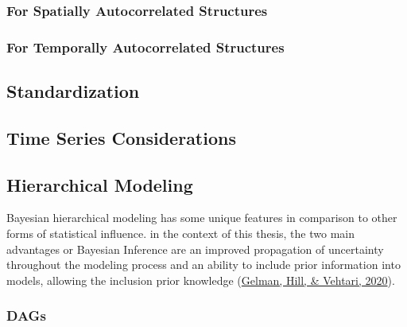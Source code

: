 \documentclass[12pt,twoside]{reedthesis}
\begin{document}
\hypertarget{for-spatially-autocorrelated-structures}{%
\subsubsection{For Spatially Autocorrelated Structures}\label{for-spatially-autocorrelated-structures}}

\hypertarget{for-temporally-autocorrelated-structures}{%
\subsubsection{For Temporally Autocorrelated Structures}\label{for-temporally-autocorrelated-structures}}

\hypertarget{standardization}{%
\subsection{Standardization}\label{standardization}}

\hypertarget{time-series-considerations}{%
\subsection{Time Series Considerations}\label{time-series-considerations}}

\hypertarget{hierarchical-modeling}{%
\subsection{Hierarchical Modeling}\label{hierarchical-modeling}}

Bayesian hierarchical modeling has some unique features in comparison to other forms of statistical influence. in the context of this thesis, the two main advantages or Bayesian Inference are an improved propagation of uncertainty throughout the modeling process and an ability to include prior information into models, allowing the inclusion prior knowledge (\protect\hyperlink{ref-gelmanRegressionOtherStories2020}{Gelman, Hill, \& Vehtari, 2020}).

\hypertarget{dags}{%
\subsubsection{DAGs}\label{dags}}
\end{document}
